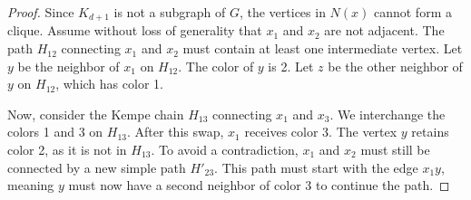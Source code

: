 \documentclass[11pt, a4paper]{ctexrep}
\begin{document}
\begin{proof}
    Since $K_{d+1}$ is not a subgraph of $G$, the vertices in $N(x)$ cannot form a clique.
    Assume without loss of generality that $x_1$ and $x_2$ are not adjacent.
    The path $H_{12}$ connecting $x_1$ and $x_2$ must contain at least one intermediate vertex.
    Let $y$ be the neighbor of $x_1$ on $H_{12}$. The color of $y$ is 2.
    Let $z$ be the other neighbor of $y$ on $H_{12}$, which has color 1.
    \begin{center}
    \end{center}

    Now, consider the Kempe chain $H_{13}$ connecting $x_1$ and $x_3$.
    We interchange the colors 1 and 3 on $H_{13}$.
    After this swap, $x_1$ receives color 3. The vertex $y$ retains color 2, as it is not in $H_{13}$.
    To avoid a contradiction, $x_1$ and $x_2$ must still be connected by a new simple path $H'_{23}$.
    This path must start with the edge $x_1y$, meaning $y$ must now have a second neighbor of color 3 to continue the path.


\end{proof}
\end{document}
